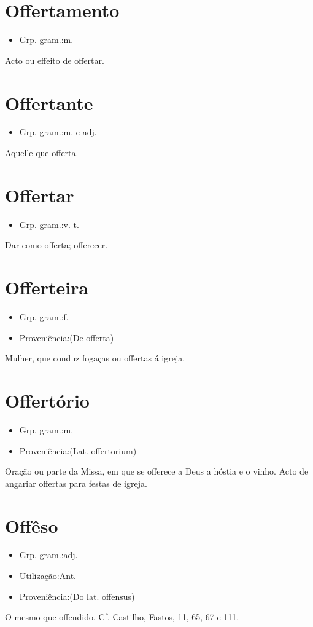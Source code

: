 \section{Offertamento}
\begin{itemize}
\item {Grp. gram.:m.}
\end{itemize}
Acto ou effeito de offertar.
\section{Offertante}
\begin{itemize}
\item {Grp. gram.:m.  e  adj.}
\end{itemize}
Aquelle que offerta.
\section{Offertar}
\begin{itemize}
\item {Grp. gram.:v. t.}
\end{itemize}
Dar como offerta; offerecer.
\section{Offerteira}
\begin{itemize}
\item {Grp. gram.:f.}
\end{itemize}
\begin{itemize}
\item {Proveniência:(De \textunderscore offerta\textunderscore )}
\end{itemize}
Mulher, que conduz fogaças ou offertas á igreja.
\section{Offertório}
\begin{itemize}
\item {Grp. gram.:m.}
\end{itemize}
\begin{itemize}
\item {Proveniência:(Lat. \textunderscore offertorium\textunderscore )}
\end{itemize}
Oração ou parte da Missa, em que se offerece a Deus a hóstia e o vinho.
Acto de angariar offertas para festas de igreja.
\section{Offêso}
\begin{itemize}
\item {Grp. gram.:adj.}
\end{itemize}
\begin{itemize}
\item {Utilização:Ant.}
\end{itemize}
\begin{itemize}
\item {Proveniência:(Do lat. \textunderscore offensus\textunderscore )}
\end{itemize}
O mesmo que \textunderscore offendido\textunderscore . Cf. Castilho, \textunderscore Fastos\textunderscore , 11, 65, 67 e 111.

